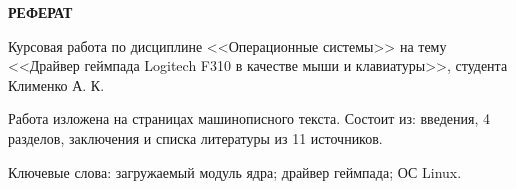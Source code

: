 \begin{center}
    {\bfseries\Large РЕФЕРАТ}
\end{center}

Курсовая работа по дисциплине <<Операционные системы>> на тему <<Драйвер геймпада Logitech F310 в качестве мыши и клавиатуры>>, студента Клименко А. К.

Работа изложена на \pageref{LastPage} страницах машинописного текста. Состоит из: введения, 4 разделов, заключения и списка литературы из 11 источников. %

Ключевые слова: загружаемый модуль ядра; драйвер геймпада; ОС Linux.

\pagebreak

